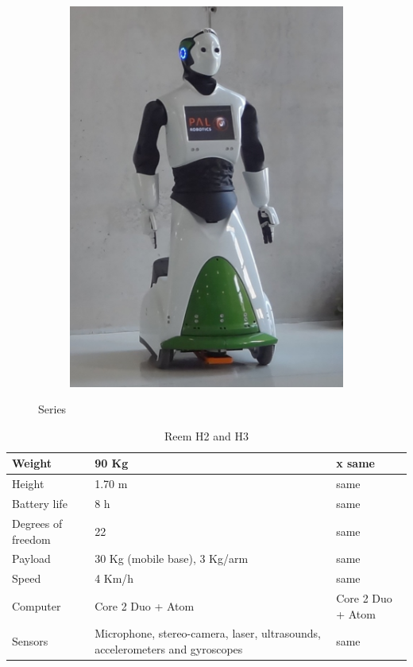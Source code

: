 \begin{figure}
    \begin{subfigure}[b]{0.5\textwidth}
           \includegraphics{figures/reemh3}
           \caption{}
           \label{fig:tiger}
    \end{subfigure}
    \caption{\reem Series}
    \label{fig:reemseries}
\end{figure}

\begin{table}[ht]
    \centering
    \begin{tabularx}{\linewidth}{| X | X | X |}
    \hline
    Weight & 90 Kg & x same\\ \hline
    Height & 1.70 m & same \\ \hline
    Battery life & 8 h & same \\ \hline
    Degrees of freedom & 22 & same \\ \hline
    Payload & 30 Kg (mobile base), 3 Kg/arm & same\\ \hline
    Speed & 4 Km/h & same\\ \hline
    Computer & Core 2 Duo + Atom & Core 2 Duo + Atom \\ \hline
    Sensors & Microphone, stereo-camera, laser, ultrasounds, accelerometers and gyroscopes & same \\
    \hline
    \end{tabularx}
    \caption{Reem H2 and H3}
    \label{tab:rh2}
\end{table}

